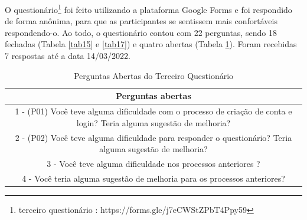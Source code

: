 O questionário\footnote{terceiro questionário : https://forms.gle/j7eCWStZPbT4Ppy59} foi feito utilizando a plataforma Google Forms e foi respondido de forma anônima, para que as
participantes se sentissem mais confortáveis respondendo-o. Ao todo, o questionário contou com 22 perguntas, sendo 18 fechadas 
(Tabela \ref{tab15} e \ref{tab17}) e 
quatro abertas (Tabela \ref{tab16}). Foram recebidas 7 respostas até a data 14/03/2022. 

\begin{table}[ht]
    \centering
    \caption{Perguntas Abertas do Terceiro Questionário}
    \label{tab16}
    \begin{tabular}{c}
        \toprule
        \textbf{Perguntas abertas} \\
        \midrule     
        \begin{minipage} [t] {1\textwidth} 1 - (P01) Você teve alguma dificuldade com o processo de criação de conta e login? Teria alguma sugestão de melhoria?\end{minipage} \\
        \midrule
        \begin{minipage} [t] {1\textwidth} 2 - (P02) Você teve alguma dificuldade para responder o questionário? Teria alguma sugestão de melhoria?\end{minipage}\\
        \midrule
        \begin{minipage} [t] {1\textwidth} 3 - Você teve alguma dificuldade nos processos anteriores ?  \end{minipage}\\
        \midrule
        \begin{minipage} [t] {1\textwidth} 4 - Você teria alguma sugestão de melhoria para os processos anteriores? \end{minipage}\\
        \bottomrule
    \end{tabular} 
\end{table}

